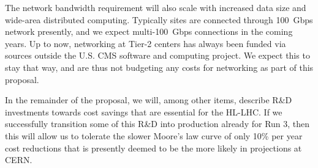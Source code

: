 \documentclass[11pt,a4paper]{article}
\begin{document}

The network bandwidth requirement will also scale with increased data size
and wide-area distributed computing.  Typically sites are connected through
100~Gbps network presently, and we expect multi-100~Gbps connections in the
coming years. Up to now, networking at Tier-2 centers has always been
funded via sources outside the U.S. CMS software and computing project. We
expect this to stay that way, and are thus not budgeting any costs for
networking as part of this proposal.

In the remainder of the proposal, we will, among other items, describe R\&D investments 
towards cost savings that are essential for the HL-LHC. If we successfully
transition some of this R\&D into production already for Run 3, then this will allow us to tolerate
the slower Moore's law curve of only 10\% per year cost reductions that is presently
deemed to be the more likely in projections at CERN.


\end{document}
